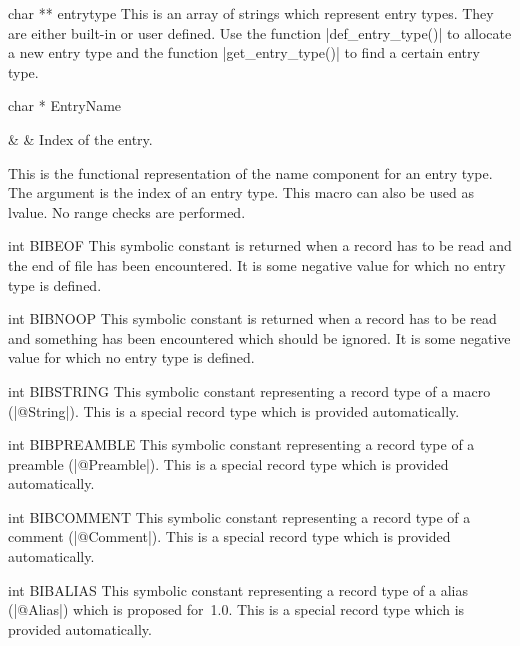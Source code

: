 \begin{Variable}{char ** }{entrytype}
  This is an array of strings which represent entry
  types. They are either built-in or user defined. Use
  the function |def_entry_type()| to allocate a new
  entry type and the function |get_entry_type()| to find
  a certain entry type.
\end{Variable}
\begin{Macro}{char * }{EntryName}
  \begin{Arguments}
    &  & Index of the entry.\\
  \end{Arguments}%
  This is the functional representation of the name
  component for an entry type. The argument is the index
  of an entry type. This macro can also be used as
  lvalue. No range checks are performed. 
\end{Macro}
\begin{Constant}{int }{BIBEOF}
  This symbolic constant is returned when a record has
  to be read and the end of file has been
  encountered. It is some negative value for which no
  entry type is defined.
\end{Constant}
\begin{Constant}{int }{BIBNOOP}
  This symbolic constant is returned when a record has
  to be read and something has been encountered which
  should be ignored. It is some negative value for which no
  entry type is defined.
\end{Constant}
\begin{Constant}{int }{BIBSTRING}
  This symbolic constant representing a record type of a
  \BibTeX{} macro (|@String|). This is a special record
  type which is provided automatically.
\end{Constant}
\begin{Constant}{int }{BIBPREAMBLE}
  This symbolic constant representing a record type of a
  \BibTeX{} preamble (|@Preamble|). This is a special record
  type which is provided automatically.
\end{Constant}
\begin{Constant}{int }{BIBCOMMENT}
  This symbolic constant representing a record type of a
  \BibTeX{} comment (|@Comment|). This is a special record
  type which is provided automatically.
\end{Constant}
\begin{Constant}{int }{BIBALIAS}
  This symbolic constant representing a record type of a
  \BibTeX{} alias (|@Alias|) which is proposed for
  \BibTeX\,1.0. This is a special record type which is
  provided automatically.
\end{Constant}
